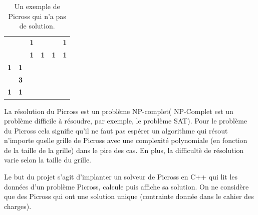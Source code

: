 \documentclass{article}
\begin{document}
\begin{table}[h]
\centering
\begin{tabular}{cccccc}
                   &                                 & \textbf{1}                                                           & \textbf{}                                     & \textbf{}                                     & \textbf{1}                                                           \\
                   & \textbf{}                       & \textbf{1}                                                           & \textbf{1}                                    & \textbf{1}                                    & \textbf{1}                                                           \\ \cline{3-6} 
\textbf{1}         & \multicolumn{1}{c|}{\textbf{1}} & \multicolumn{1}{c|}{\cellcolor[HTML]{000000}}                        & \multicolumn{1}{c|}{}                         & \multicolumn{1}{c|}{}                         & \multicolumn{1}{c|}{\cellcolor[HTML]{000000}}                        \\ \cline{3-6} 
\textit{\textbf{}} & \multicolumn{1}{c|}{\textbf{3}} & \multicolumn{1}{c|}{\cellcolor[HTML]{C0C0C0}{\color[HTML]{9B9B9B} }} & \multicolumn{1}{c|}{\cellcolor[HTML]{000000}} & \multicolumn{1}{c|}{\cellcolor[HTML]{000000}} & \multicolumn{1}{c|}{\cellcolor[HTML]{C0C0C0}{\color[HTML]{9B9B9B} }} \\ \cline{3-6} 
\textbf{1}         & \multicolumn{1}{c|}{\textbf{1}} & \multicolumn{1}{c|}{\cellcolor[HTML]{000000}}                        & \multicolumn{1}{c|}{}                         & \multicolumn{1}{c|}{}                         & \multicolumn{1}{c|}{\cellcolor[HTML]{000000}}                        \\ \cline{3-6} 
\end{tabular}
\caption{Un exemple de Picross qui n'a pas de solution.}
\end{table}
\newpage
La r\'esolution du Picross est un probl\`eme NP-complet( NP-Complet est un probl\`eme difficile \`a r\'esoudre, par exemple, le probl\`eme SAT). Pour le probl\`eme du Picross cela signifie qu'il ne faut pas esp\'erer un algorithme qui r\'esout n'importe quelle grille de Picross avec une complexit\'e polynomiale (en fonction de la taille de la grille) dans le pire des cas. En plus, la difficult\`e de r\'esolution varie selon la taille du grille.

Le but du projet s'agit d'implanter un solveur de Picross en C++ qui lit les donn\'ees d'un probl\`eme Picross, calcule puis affiche sa solution. On ne consid\`ere que des Picross qui ont une solution unique (contrainte donn\'ee dans le cahier des charges).
\end{document}
